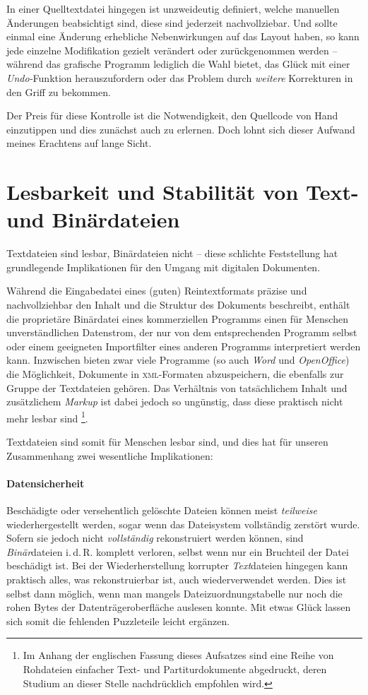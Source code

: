 \documentclass[DIV=12]{scrreprt}
\begin{document}
In einer Quelltextdatei hingegen ist unzweideutig definiert, welche manuellen Änderungen beabsichtigt sind, diese sind jederzeit nachvollziebar.
Und sollte einmal eine Änderung erhebliche Nebenwirkungen auf das Layout haben, so kann jede einzelne Modifikation gezielt verändert oder zurückgenommen werden -- während das grafische Programm lediglich die Wahl bietet, das Glück mit einer \emph{Undo-}Funktion herauszufordern oder das Problem durch \emph{weitere} Korrekturen in den Griff zu bekommen.

Der Preis für diese Kontrolle ist die Notwendigkeit, den Quellcode von Hand einzutippen und dies zunächst auch zu erlernen.
Doch lohnt sich dieser Aufwand meines Erachtens auf lange Sicht.


\section{Lesbarkeit und Stabilität von Text- und Binärdateien}
\label{sec:pt_readability-stability}
Textdateien sind lesbar, Binärdateien nicht -- diese schlichte Feststellung hat grundlegende Implikationen für den Umgang mit digitalen Dokumenten.

Während die Eingabedatei eines (guten) Reintextformats präzise und nachvollziehbar den Inhalt und die Struktur des Dokuments beschreibt, enthält die proprietäre Binärdatei eines kommerziellen Programms einen für Menschen unverständlichen Datenstrom, der nur von dem entsprechenden Programm selbst oder einem geeigneten Importfilter eines anderen Programms interpretiert werden kann.
Inzwischen bieten zwar viele Programme (so auch \emph{Word} und \emph{OpenOffice}) die Möglichkeit, Dokumente in \textsc{xml}-Formaten abzuspeichern, die ebenfalls zur Gruppe der Textdateien gehören.
Das Verhältnis von tatsächlichem Inhalt und zusätzlichem \emph{Markup} ist dabei jedoch so ungünstig, dass diese praktisch nicht mehr lesbar sind%
\footnote{Im Anhang der englischen Fassung dieses Aufsatzes sind eine Reihe von Rohdateien einfacher Text- und Partiturdokumente abgedruckt, deren Studium an dieser Stelle nachdrücklich empfohlen wird.}.

Textdateien sind somit für Menschen lesbar sind, und dies hat für unseren Zusammenhang zwei wesentliche Implikationen:

\paragraph{Datensicherheit}
Beschädigte oder versehentlich gelöschte Dateien können meist \emph{teilweise} wiederhergestellt werden, sogar wenn das Dateisystem vollständig zerstört wurde.
Sofern sie jedoch nicht \emph{vollständig} rekonstruiert werden können, sind \emph{Binär}dateien i.\,d.\,R. komplett verloren, selbst wenn nur ein Bruchteil der Datei beschädigt ist.
Bei der Wiederherstellung korrupter \emph{Text}dateien hingegen kann praktisch alles, was rekonstruierbar ist, auch wiederverwendet werden.
Dies ist selbst dann möglich, wenn man mangels Dateizuordnungstabelle nur noch die rohen Bytes der Datenträgeroberfläche auslesen konnte.
Mit etwas Glück lassen sich somit die fehlenden Puzzleteile leicht ergänzen.
\end{document}
